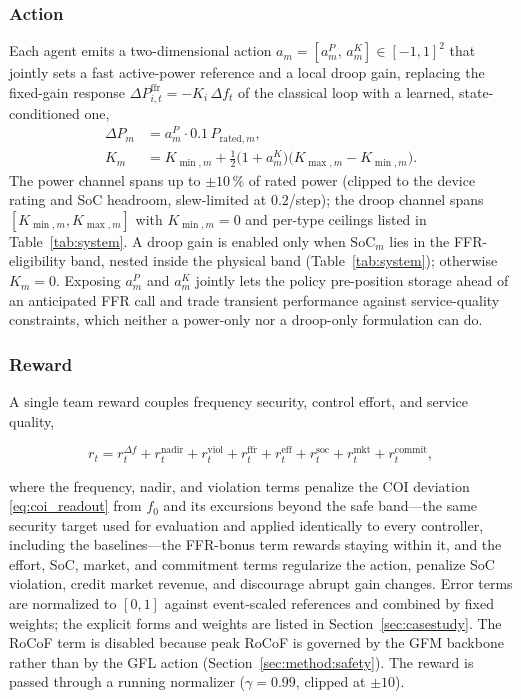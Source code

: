 \documentclass[lettersize,journal]{IEEEtran}
\begin{document}
\subsubsection{Action}
Each agent emits a two-dimensional action $a_m=[a^P_m,\,a^K_m]\in[-1,1]^2$ that jointly sets a fast active-power reference and a local droop gain, replacing the fixed-gain response $\Delta P^{\mathrm{ffr}}_{i,t}=-K_i\,\Delta f_t$ of the classical loop with a learned, state-conditioned one,
\begin{align}
  \Delta P_m &= a^P_m\cdot 0.1\,P_{\mathrm{rated},m},
  \label{eq:action_power}\\
  K_m &= K_{\min,m}+\tfrac{1}{2}\big(1+a^K_m\big)\big(K_{\max,m}-K_{\min,m}\big).
  \label{eq:action_droop}
\end{align}
The power channel spans up to $\pm10\,\%$ of rated power (clipped to the device rating and SoC headroom, slew-limited at $0.2$/step); the droop channel spans $[K_{\min,m},K_{\max,m}]$ with $K_{\min,m}=0$ and per-type ceilings listed in Table~\ref{tab:system}. A droop gain is enabled only when $\mathrm{SoC}_m$ lies in the FFR-eligibility band, nested inside the physical band (Table~\ref{tab:system}); otherwise $K_m=0$. Exposing $a^P_m$ and $a^K_m$ jointly lets the policy pre-position storage ahead of an anticipated FFR call and trade transient performance against service-quality constraints, which neither a power-only nor a droop-only formulation can do.
\subsubsection{Reward}
A single team reward couples frequency security, control effort, and service quality,

\begin{equation}
  r_t = r^{\Delta f}_t + r^{\mathrm{nadir}}_t + r^{\mathrm{viol}}_t
        + r^{\mathrm{ffr}}_t + r^{\mathrm{eff}}_t + r^{\mathrm{soc}}_t
        + r^{\mathrm{mkt}}_t + r^{\mathrm{commit}}_t,
  \label{eq:reward}
\end{equation}

where the frequency, nadir, and violation terms penalize the COI deviation \eqref{eq:coi_readout} from $f_0$ and its excursions beyond the safe band---the same security target used for evaluation and applied identically to every controller, including the baselines---the FFR-bonus term rewards staying within it, and the effort, SoC, market, and commitment terms regularize the action, penalize SoC violation, credit market revenue, and discourage abrupt gain changes. Error terms are normalized to $[0,1]$ against event-scaled references and combined by fixed weights; the explicit forms and weights are listed in Section~\ref{sec:casestudy}. The RoCoF term is disabled because peak RoCoF is governed by the GFM backbone rather than by the GFL action (Section~\ref{sec:method:safety}). The reward is passed through a running normalizer ($\gamma=0.99$, clipped at $\pm10$).
\end{document}
